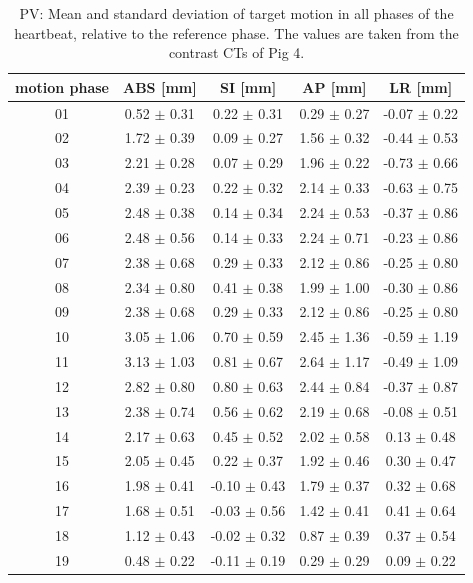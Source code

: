 \documentclass[type=dr, dr=rernat, accentcolor=tud7b,colorbacktitle, bigchapter, openright, twoside, 12pt ]{tudthesis}
\begin{document}
\begin{table}[H]
  \centering
  \scriptsize
  \caption{PV: Mean and standard deviation of target motion in all phases of the heartbeat, relative to the reference phase. The values are 
  taken from the contrast CTs of Pig 4.}
  \begin{tabular}{|c|c|c|c|c|}
    \hline\hline
    motion phase\rule{0pt}{2.6ex}\rule[-1.2ex]{0pt}{0pt} & ABS [mm] & SI [mm] & AP [mm] & LR [mm]\\
    \hline
01 &0.52 $\pm$ 0.31 &0.22 $\pm$ 0.31 &0.29 $\pm$ 0.27 &-0.07 $\pm$ 0.22 \\
02 &1.72 $\pm$ 0.39 &0.09 $\pm$ 0.27 &1.56 $\pm$ 0.32 &-0.44 $\pm$ 0.53 \\
03 &2.21 $\pm$ 0.28 &0.07 $\pm$ 0.29 &1.96 $\pm$ 0.22 &-0.73 $\pm$ 0.66 \\
04 &2.39 $\pm$ 0.23 &0.22 $\pm$ 0.32 &2.14 $\pm$ 0.33 &-0.63 $\pm$ 0.75 \\
05 &2.48 $\pm$ 0.38 &0.14 $\pm$ 0.34 &2.24 $\pm$ 0.53 &-0.37 $\pm$ 0.86 \\
06 &2.48 $\pm$ 0.56 &0.14 $\pm$ 0.33 &2.24 $\pm$ 0.71 &-0.23 $\pm$ 0.86 \\
07 &2.38 $\pm$ 0.68 &0.29 $\pm$ 0.33 &2.12 $\pm$ 0.86 &-0.25 $\pm$ 0.80 \\
08 &2.34 $\pm$ 0.80 &0.41 $\pm$ 0.38 &1.99 $\pm$ 1.00 &-0.30 $\pm$ 0.86 \\
09 &2.38 $\pm$ 0.68 &0.29 $\pm$ 0.33 &2.12 $\pm$ 0.86 &-0.25 $\pm$ 0.80 \\
10 &3.05 $\pm$ 1.06 &0.70 $\pm$ 0.59 &2.45 $\pm$ 1.36 &-0.59 $\pm$ 1.19 \\
11 &3.13 $\pm$ 1.03 &0.81 $\pm$ 0.67 &2.64 $\pm$ 1.17 &-0.49 $\pm$ 1.09 \\
12 &2.82 $\pm$ 0.80 &0.80 $\pm$ 0.63 &2.44 $\pm$ 0.84 &-0.37 $\pm$ 0.87 \\
13 &2.38 $\pm$ 0.74 &0.56 $\pm$ 0.62 &2.19 $\pm$ 0.68 &-0.08 $\pm$ 0.51 \\
14 &2.17 $\pm$ 0.63 &0.45 $\pm$ 0.52 &2.02 $\pm$ 0.58 &0.13 $\pm$ 0.48 \\
15 &2.05 $\pm$ 0.45 &0.22 $\pm$ 0.37 &1.92 $\pm$ 0.46 &0.30 $\pm$ 0.47 \\
16 &1.98 $\pm$ 0.41 &-0.10 $\pm$ 0.43 &1.79 $\pm$ 0.37 &0.32 $\pm$ 0.68 \\
17 &1.68 $\pm$ 0.51 &-0.03 $\pm$ 0.56 &1.42 $\pm$ 0.41 &0.41 $\pm$ 0.64 \\
18 &1.12 $\pm$ 0.43 &-0.02 $\pm$ 0.32 &0.87 $\pm$ 0.39 &0.37 $\pm$ 0.54 \\
19 &0.48 $\pm$ 0.22 &-0.11 $\pm$ 0.19 &0.29 $\pm$ 0.29 &0.09 $\pm$ 0.22 \\
    \hline\hline
  \end{tabular}
  \label{tab:motion:PV:Pig4}
\end{table}
\end{document}
